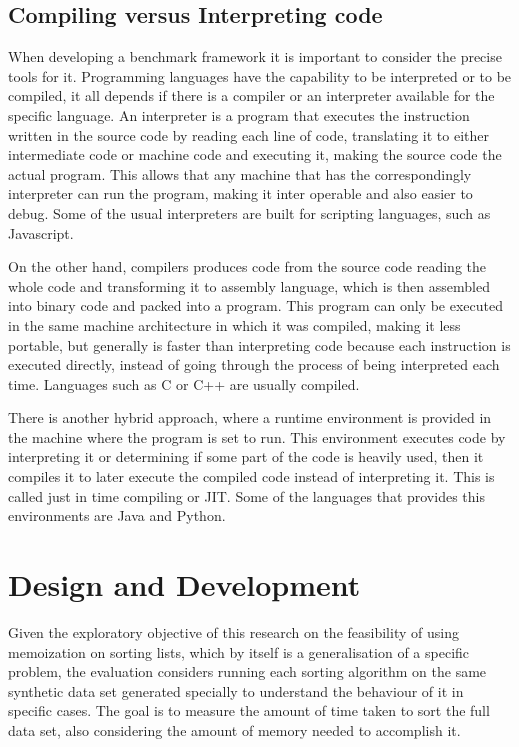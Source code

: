 \documentclass[a4paper,12pt]{article}
\begin{document}
\subsection{Compiling versus Interpreting code}
When developing a benchmark framework it is important to consider the precise tools for it. Programming languages have the capability to be interpreted or to be compiled, it all depends if there is a compiler or an interpreter available for the specific language. An interpreter is a program that executes the instruction written in the source code by reading each line of code, translating it to either intermediate code or machine code and executing it, making the source code the actual program. This allows that any machine that has the correspondingly interpreter can run the program, making it inter operable and also easier to debug. Some of the usual interpreters are built for scripting languages, such as Javascript.

On the other hand, compilers produces code from the source code  reading the whole code and transforming it to assembly language, which is then assembled into binary code and packed into a program. This program can only be executed in the same machine architecture in which it was compiled, making it less portable, but generally is faster than interpreting code because each instruction is executed directly, instead of going through the process of being interpreted each time. Languages such as C or C++ are usually compiled.

There is another hybrid approach, where a runtime environment is provided in the machine where the program is set to run. This environment executes code by interpreting it or determining if some part of the code is heavily used, then it compiles it to later execute the compiled code instead of interpreting it. This is called  just in time compiling or JIT. Some of the languages that provides this environments are Java and Python.

\section{Design and Development}
Given the exploratory objective of this research on the feasibility of using memoization on sorting lists, which by itself is a generalisation of a specific problem, the evaluation considers running each sorting algorithm on the same synthetic data set generated specially to understand the behaviour of it in specific cases. The goal is to measure the amount of time taken to sort the full data set, also considering the amount of memory needed to accomplish it.
\end{document}

